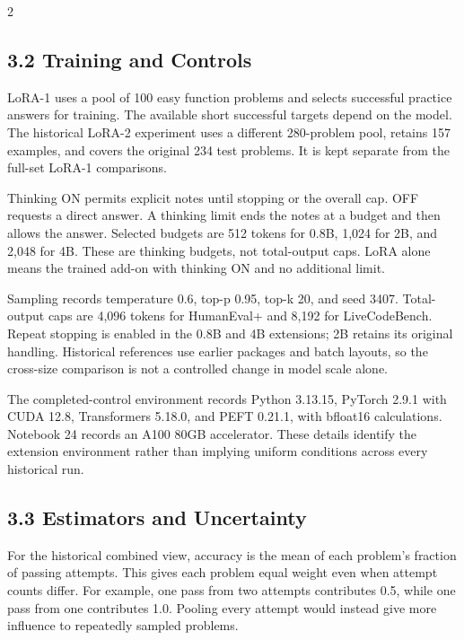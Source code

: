 \documentclass[11pt,letterpaper]{article}
\begin{document}
\begin{multicols}{2}
\subsection*{3.2 Training and Controls}

LoRA-1 uses a pool of 100 easy function problems and selects successful practice answers for training. The available short successful targets depend on the model. The historical LoRA-2 experiment uses a different 280-problem pool, retains 157 examples, and covers the original 234 test problems. It is kept separate from the full-set LoRA-1 comparisons.\par

Thinking ON permits explicit notes until stopping or the overall cap. OFF requests a direct answer. A thinking limit ends the notes at a budget and then allows the answer. Selected budgets are 512 tokens for 0.8B, 1,024 for 2B, and 2,048 for 4B. These are thinking budgets, not total-output caps. LoRA alone means the trained add-on with thinking ON and no additional limit.\par

Sampling records temperature 0.6, top-p 0.95, top-k 20, and seed 3407. Total-output caps are 4,096 tokens for HumanEval+ and 8,192 for LiveCodeBench. Repeat stopping is enabled in the 0.8B and 4B extensions; 2B retains its original handling. Historical references use earlier packages and batch layouts, so the cross-size comparison is not a controlled change in model scale alone.\par

The completed-control environment records Python 3.13.15, PyTorch 2.9.1 with CUDA 12.8, Transformers 5.18.0, and PEFT 0.21.1, with bfloat16 calculations. Notebook 24 records an A100 80GB accelerator. These details identify the extension environment rather than implying uniform conditions across every historical run.\par

\subsection*{3.3 Estimators and Uncertainty}

For the historical combined view, accuracy is the mean of each problem's fraction of passing attempts. This gives each problem equal weight even when attempt counts differ. For example, one pass from two attempts contributes 0.5, while one pass from one contributes 1.0. Pooling every attempt would instead give more influence to repeatedly sampled problems.\par


\end{multicols}
\end{document}
